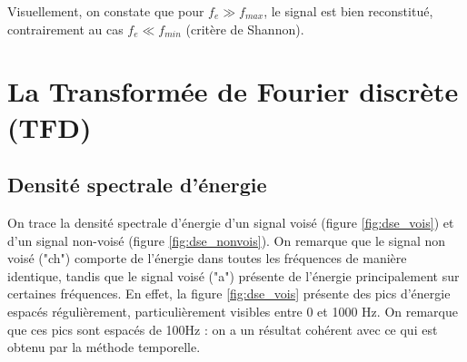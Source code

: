 \documentclass[french]{article}
\begin{document}
Visuellement, on constate que pour $f_e \gg f_{max}$, le signal est bien reconstitué, contrairement au cas $f_e \ll f_{min}$ (critère de Shannon).

\FloatBarrier
\section{La Transformée de Fourier discrète (TFD)}

\subsection{Densité spectrale d'énergie}
On trace la densité spectrale d'énergie d'un signal voisé (figure \ref{fig:dse_vois}) et d'un signal non-voisé (figure \ref{fig:dse_nonvois}). On remarque que le signal non voisé ("ch") comporte de l'énergie dans toutes les fréquences de manière identique, tandis que le signal voisé ("a") présente de l'énergie principalement sur certaines fréquences. En effet, la figure \ref{fig:dse_vois} présente des pics d'énergie espacés régulièrement, particulièrement visibles entre 0 et 1000 Hz. On remarque que ces pics sont espacés de 100Hz : on a un résultat cohérent avec ce qui est obtenu par la méthode temporelle.
\end{document}

